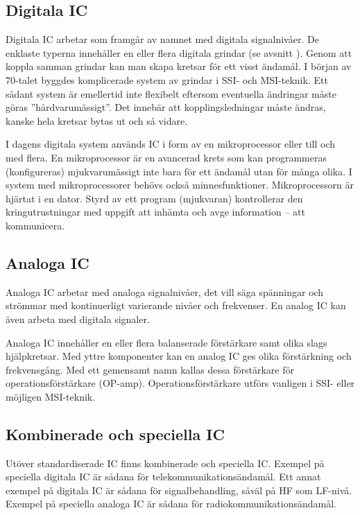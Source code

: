 \subsection{Digitala IC}

Digitala IC arbetar som framgår av namnet med digitala signalnivåer.
De enklaste typerna innehåller en eller flera digitala grindar (se avsnitt
).
Genom att koppla samman grindar kan man skapa kretsar för ett visst ändamål.
I början av 70-talet byggdes komplicerade system av grindar i SSI- och
MSI-teknik.
Ett sådant system är emellertid inte flexibelt eftersom eventuella ändringar
måste göras ''hårdvarumässigt''.
Det innebär att kopplingsledningar måste ändras, kanske hela kretsar bytas ut
och så vidare.

I dagens digitala system används IC i form av en mikroprocessor eller till och
med flera.
En mikroprocessor är en avancerad krets som kan programmeras (konfigureras)
mjukvarumässigt inte bara för ett ändamål utan för många olika.
I system med mikroprocessorer behövs också minnesfunktioner.
Mikroprocessorn är hjärtat i en dator.
Styrd av ett program (mjukvaran) kontrollerar den kringutrustningar med uppgift
att inhämta och avge information -- att kommunicera.

\subsection{Analoga IC}

Analoga IC arbetar med analoga signalnivåer, det vill säga spänningar och
strömmar med kontinuerligt varierande nivåer och frekvenser.
En analog IC kan även arbeta med digitala signaler.

Analoga IC innehåller en eller flera balanserade förstärkare samt olika slags
hjälpkretsar.
Med yttre komponenter kan en analog IC ges olika förstärkning och frekvensgång.
Med ett gemensamt namn kallas dessa förstärkare för operationsförstärkare
(OP-amp).
Operationsförstärkare utförs vanligen i SSI- eller möjligen MSI-teknik.

\subsection{Kombinerade och speciella IC}

Utöver standardiserade IC finns kombinerade och speciella IC.
Exempel på speciella digitala IC är sådana för telekommunikationsändamål.
Ett annat exempel på digitala IC är sådana för signalbehandling, såväl på HF
som LF-nivå.
Exempel på speciella analoga IC är sådana för radiokommunikationsändamål.

